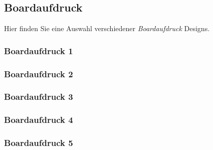 \subsection{Boardaufdruck}

\noindent
Hier finden Sie eine Auswahl verschiedener \textit{Boardaufdruck} Designs.

\subsubsection{Boardaufdruck 1}
\noindent
\begin{figure}[ht]
	\centering
  
	\label{pic/form_board_01}
\end{figure}

\newpage

\subsubsection{Boardaufdruck 2}
\noindent
\begin{figure}[ht]
	\centering
  
	\label{pic/form_board_02}
\end{figure}

\newpage

\subsubsection{Boardaufdruck 3}
\noindent
\begin{figure}[ht]
	\centering
  
	\label{pic/form_board_03}
\end{figure}

\newpage

\subsubsection{Boardaufdruck 4}
\noindent
\begin{figure}[ht]
	\centering
  
	\label{pic/form_board_04}
\end{figure}

\newpage

\subsubsection{Boardaufdruck 5}
\noindent
\begin{figure}[ht]
	\centering
  
	\label{pic/form_board_05}
\end{figure}
